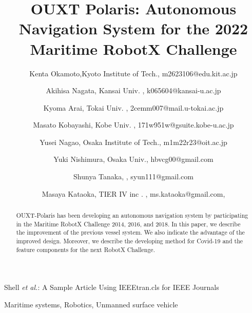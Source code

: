 \documentclass[lettersize,journal]{IEEEtran}
\begin{document}
\title{OUXT Polaris: Autonomous Navigation System for the 2022 Maritime RobotX Challenge}
\author{
    Kenta Okamoto,Kyoto Institute of Tech., m2623106@edu.kit.ac.jp \\ \and
    Akihisa Nagata, Kansai Univ. , k065604@kansai-u.ac.jp \\ \and
    Kyoma Arai, Tokai Univ. , 2cemm007@mail.u-tokai.ac.jp \\ \and
    Masato Kobayashi, Kobe Univ. , 171w951w@gsuite.kobe-u.ac.jp \\ \and
    Yusei Nagao, Osaka Institute of Tech., m1m22r23@oit.ac.jp \\ \and
    Yuki Nishimura, Osaka Univ., hbvcg00@gmail.com \\ \and
    Shunya Tanaka, , syun111@gmail.com \\ \and
    Masaya Kataoka, TIER IV inc . , ms.kataoka@gmail.com,
}

%
{Shell \MakeLowercase{\textit{et al.}}: A Sample Article Using IEEEtran.cls for IEEE Journals}


\maketitle

\begin{abstract}
OUXT-Polaris has been developing an autonomous navigation system by participating in the 
Maritime RobotX Challenge 2014, 2016, and 2018. 
In this paper, we describe the improvement of the previous vessel system. 
We also indicate the advantage of the improved design.
Moreover, we describe the developing method for Covid-19 and the 
feature components for the next RobotX Challenge.
\end{abstract}

\begin{IEEEkeywords}
Maritime systems, Robotics, Unmanned surface vehicle
\end{IEEEkeywords}
\end{document}
